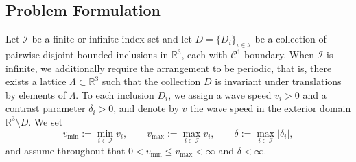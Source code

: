 \documentclass[a4paper,reqno,twoside]{amsart}
\numberwithin{equation}{section}
\theoremstyle{definition}
\newcommand{\<}{\ensuremath \leq}
\renewcommand{\>}{\ensuremath \geq}
\begin{document}
\subsection{Problem Formulation}
Let $\mathcal{I}$ be a finite or infinite index set and let $D = \{D_i\}_{i \in \mathcal{I}}$ be a collection of pairwise disjoint bounded inclusions in $\mathbb{R}^3$, each with $\mathcal{C}^1$ boundary. When $\mathcal{I}$ is infinite, we additionally require the arrangement to be periodic, that is, there exists a lattice $\Lambda \subset \mathbb{R}^3$ such that the collection $D$ is invariant under translations by elements of $\Lambda$. To each inclusion $D_i$, we assign a wave speed $v_i > 0$ and a contrast parameter $\delta_i > 0$, and denote by $v$ the wave speed in the exterior domain $\mathbb{R}^3 \setminus \overline{D}$. We set
\begin{equation}
    v_{\min} := \min_{i \in \mathcal{I}} v_i, \qquad
    v_{\max} := \max_{i \in \mathcal{I}} v_i, \qquad
    \delta := \max_{i \in \mathcal{I}} \lvert \delta_i \rvert,
\end{equation}
and assume throughout that $0 < v_{\min} \leq v_{\max} < \infty$ and $\delta < \infty$. 
\end{document}
